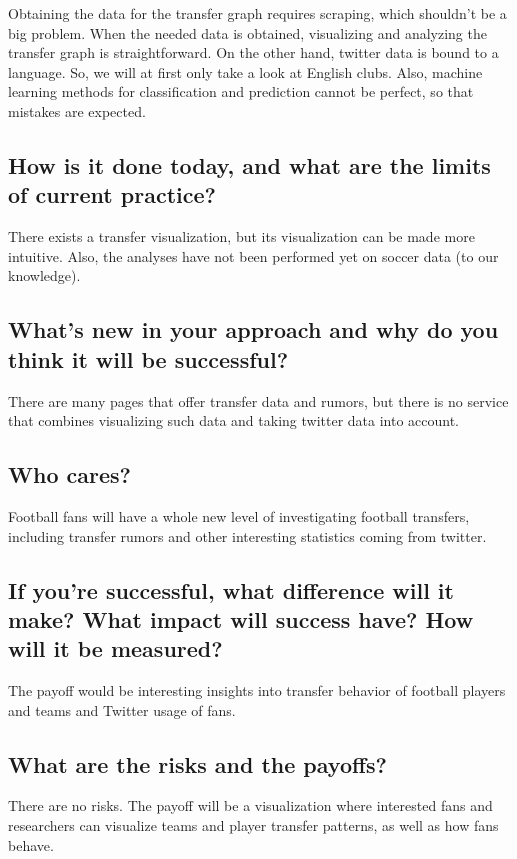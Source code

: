 \documentclass{article}
\begin{document}
Obtaining the data for the transfer graph requires scraping, which shouldn't be a big problem. When the needed data is obtained, visualizing and analyzing the transfer graph is straightforward. On the other hand, twitter data is bound to a language. So, we will at first only take a look at English clubs. Also, machine learning methods for classification and prediction cannot be perfect, so that mistakes are expected. 

\subsection{How is it done today, and what are the limits of current practice?}

There exists a transfer visualization, but its visualization can be made more intuitive.
Also, the analyses have not been performed yet on soccer data (to our knowledge).

\subsection{What's new in your approach and why do you think it will be successful?}
There are many pages that offer transfer data and rumors, but there is no service that combines visualizing such data and taking twitter data into account. 

\subsection{Who cares?}
Football fans will have a whole new level of investigating football transfers, including transfer rumors and other interesting statistics coming from twitter.

\subsection{If you're successful, what difference will it make? What impact will success have? How will it be measured?}
\label{sec:difference_impact}

The payoff would be interesting insights into transfer behavior of football players and teams and Twitter usage of fans. 

\subsection{What are the risks and the payoffs?}

There are no risks. The payoff will be a visualization where interested fans and researchers can visualize teams and player transfer patterns, as well as how fans behave. 
\end{document}
